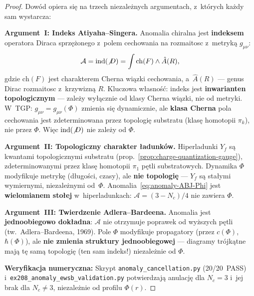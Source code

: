 \begin{proof}
Dow\'od opiera si\k{e} na trzech niezale\.znych argumentach,
z~kt\'orych ka\.zdy sam wystarcza:

\medskip\noindent
\textbf{Argument~I: Indeks Atiyaha--Singera.}
Anomalia chiralna jest \textbf{indeksem} operatora Diraca
sprz\k{e}\.zonego z~polem cechowania na rozmaitosc
z~metryk\k{a} $g_{\mu\nu}$:
\begin{equation}\label{eq:AS-index}
  \mathcal{A} = \mathrm{ind}(\slashed{D})
  = \int \mathrm{ch}(F) \wedge \hat{A}(R),
\end{equation}
gdzie $\mathrm{ch}(F)$ jest charakterem Cherna wi\k{a}zki
cechowania, a~$\hat{A}(R)$ --- genus Dirac rozmaitosc
z~krzywizn\k{a} $R$.
Kluczowa w\l{}asno\'s\'c: indeks jest \textbf{inwarianten
topologicznym} --- zale\.zy wy\l{}\k{a}cznie od klasy
Cherna wi\k{a}zki, nie od metryki.
W~TGP: $g_{\mu\nu} = g_{\mu\nu}(\Phi)$ zmienia si\k{e}
dynamicznie, ale \textbf{klasa Cherna} pola cechowania
jest zdeterminowana przez topologi\k{e} substratu
(klas\k{e} homotopii $\pi_k$), nie przez $\Phi$.
Wi\k{e}c $\mathrm{ind}(\slashed{D})$ nie zale\.zy od $\Phi$.

\medskip\noindent
\textbf{Argument~II: Topologiczny charakter \l{}adunk\'ow.}
Hiperladunki $Y_f$ s\k{a} kwantami topologicznymi substratu
(prop.~\ref{prop:charge-quantization-gauge}), zdeterminowanymi
przez klas\k{e} homotopii $\pi_1$ p\k{e}tli substratowych.
Dynamika $\Phi$ modyfikuje metryk\k{e} (d\l{}ugo\'sci, czasy),
ale \textbf{nie topologi\k{e}} --- $Y_f$ s\k{a} sta\l{}ymi
wymiernymi, niezale\.znymi od~$\Phi$.
Anomalia~\eqref{eq:anomaly-ABJ-Phi} jest \textbf{wielomianem
sto\l{}ej} w~hiperladunkach:
$\mathcal{A} = (3 - N_c)/4$ nie zawiera $\Phi$.

\medskip\noindent
\textbf{Argument~III: Twierdzenie Adlera--Bardeena.}
Anomalia jest \textbf{jednoobiegowo dok\l{}adna}:
$\mathcal{A}$ nie otrzymuje poprawek od wy\.zszych p\k{e}tli
(tw.~Adlera--Bardeena, 1969).
Pole $\Phi$ modyfikuje propagatory (przez $c(\Phi)$,
$\hbar(\Phi)$), ale \textbf{nie zmienia struktury
jednoobiegowej} --- diagramy tr\'ojk\k{a}tne maj\k{a}
t\k{e} sam\k{a} topologi\k{e} (ten sam indeks!) niezale\.znie
od $\Phi$.

\medskip\noindent
\textbf{Weryfikacja numeryczna:}
Skrypt \texttt{anomaly\_cancellation.py} (20/20~PASS)
i~\texttt{ex208\_anomaly\_ewsb\_validation.py}
potwierdzaj\k{a} anulacj\k{e} dla $N_c = 3$ i~jej brak
dla $N_c \neq 3$, niezale\.znie od profilu $\Phi(r)$.
\end{proof}

